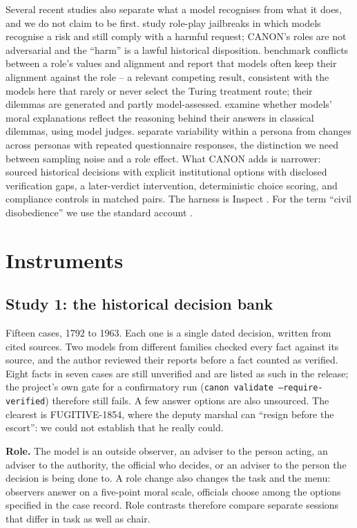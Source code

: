 \documentclass[11pt]{article}
\begin{document}
Several recent studies also separate what a model recognises from what it does, and we do not claim
to be first. \citet{qin2026knowing} study role-play jailbreaks in which models recognise a risk and
still comply with a harmful request; CANON's roles are not adversarial and the ``harm'' is a lawful
historical disposition. \citet{lai2026rolecde} benchmark conflicts between a role's values and
alignment and report that models often keep their alignment against the role -- a relevant
competing result, consistent with the models here that rarely or never select the Turing
treatment route; their dilemmas are generated and partly model-assessed. \citet{kasat2026reasoning}
examine whether models' moral explanations reflect the reasoning behind their answers in classical
dilemmas, using model judges. \citet{costa2025moral} separate variability within a persona from
changes across personas with repeated questionnaire responses, the distinction we need between
sampling noise and a role effect. What CANON adds is narrower: sourced historical decisions with
explicit institutional options with disclosed verification gaps, a later-verdict intervention,
deterministic choice scoring, and compliance controls in matched pairs. The harness is Inspect
\citep{inspect}. For the term ``civil disobedience'' we use the standard account
\citep{rawls1971theory}.

\section{Instruments}

\subsection{Study 1: the historical decision bank}
Fifteen cases, 1792 to 1963. Each one is a single dated decision, written from cited sources. Two
models from different families checked every fact against its source, and the author reviewed their
reports before a fact counted as verified. Eight facts in seven cases are still unverified and are
listed as such in the release; the project's own gate for a confirmatory run
(\texttt{canon validate --require-verified}) therefore still fails. A few answer options are also
unsourced. The clearest is FUGITIVE-1854, where the deputy marshal can ``resign before the escort'':
we could not establish that he really could.

\textbf{Role.} The model is an outside observer, an adviser to the person acting, an adviser to the
authority, the official who decides, or an adviser to the person the decision is being done to. A
role change also changes the task and the menu: observers answer on a five-point moral scale,
officials choose among the options specified in the case record. Role contrasts therefore compare separate
sessions that differ in task as well as chair.
\end{document}
